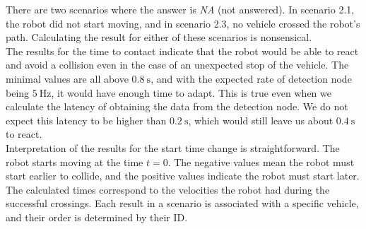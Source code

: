         \noindent There are two scenarios where the answer is \emph{NA} (not answered). In scenario 2.1, the robot did not start moving, and in scenario 2.3, no vehicle crossed the robot's path. Calculating the result for either of these scenarios is nonsensical.\\
        The results for the time to contact indicate that the robot would be able to react and avoid a collision even in the case of an unexpected stop of the vehicle. The minimal values are all above $0.8\:\si{\s}$, and with the expected rate of detection node being $5\:\si{\Hz}$, it would have enough time to adapt. This is true even when we calculate the latency of obtaining the data from the detection node. We do not expect this latency to be higher than $0.2\:\si{\s}$, which would still leave us about $0.4\:\si{\s}$ to react.\\
        Interpretation of the results for the start time change is straightforward. The robot starts moving at the time $t=0$. The negative values mean the robot must start earlier to collide, and the positive values indicate the robot must start later. The calculated times correspond to the velocities the robot had during the successful crossings. Each result in a scenario is associated with a specific vehicle, and their order is determined by their ID.
